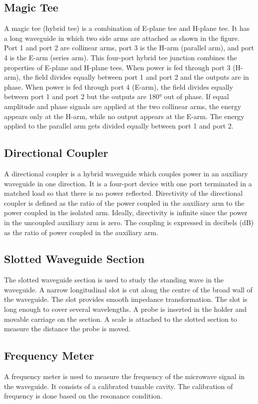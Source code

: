 \documentclass[11pt, a4paper]{article}
\begin{document}
\subsection{Magic Tee}
A magic tee (hybrid tee) is a combination of E-plane tee and H-plane tee. It has a long waveguide in which two
side arms are attached as shown in the figure. Port 1 and port 2 are collinear arms, port 3 is the H-arm (parallel
arm), and port 4 is the E-arm (series arm).
This four-port hybrid tee junction combines the properties of E-plane and H-plane tees. When power is fed
through port 3 (H-arm), the field divides equally between port 1 and port 2 and the outputs are in phase.
When power is fed through port 4 (E-arm), the field divides equally between port 1 and port 2 but the outputs are
180° out of phase.
If equal amplitude and phase signals are applied at the two collinear arms, the energy appears only at the H-arm,
while no output appears at the E-arm. The energy applied to the parallel arm gets divided equally between port 1
and port 2.
\subsection{Directional Coupler}
A directional coupler is a hybrid waveguide which couples power in an auxiliary waveguide in one direction. It
is a four-port device with one port terminated in a matched load so that there is no power reflected.
Directivity of the directional coupler is defined as the ratio of the power coupled in the auxiliary arm to the power
coupled in the isolated arm. Ideally, directivity is infinite since the power in the uncoupled auxiliary arm is zero.
The coupling is expressed in decibels (dB) as the ratio of power coupled in the auxiliary arm.
\subsection{Slotted Waveguide Section}
The slotted waveguide section is used to study the standing wave in the waveguide. A narrow longitudinal slot
is cut along the centre of the broad wall of the waveguide. The slot provides smooth impedance transformation.
The slot is long enough to cover several wavelengths.
A probe is inserted in the holder and movable carriage on the section. A scale is attached to the slotted section to
measure the distance the probe is moved.
\subsection{Frequency Meter}
A frequency meter is used to measure the frequency of the microwave signal in the waveguide. It consists of a
calibrated tunable cavity. The calibration of frequency is done based on the resonance condition.
\end{document}

